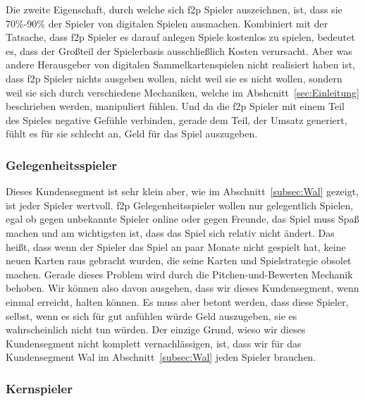 \documentclass[fontsize=12, a4aper]{scrartcl}
\begin{document}
\noindent Die zweite Eigenschaft, durch welche sich \ac{f2p} Spieler auszeichnen, ist, dass sie 70\%-90\% der Spieler von digitalen Spielen ausmachen. Kombiniert mit der Tatsache, dass \ac{f2p} Spieler es darauf anlegen Spiele kostenlos zu spielen, bedeutet es, dass der Großteil der Spielerbasis ausschließlich Kosten verursacht. Aber was andere Herausgeber von digitalen Sammelkartenspielen nicht realisiert haben ist, dass \ac{f2p} Spieler nichts ausgeben wollen, nicht weil sie es nicht wollen, sondern weil sie sich durch verschiedene Mechaniken, welche im Abshcnitt~\ref{sec:Einleitung} beschrieben werden, manipuliert fühlen. Und da die \ac{f2p} Spieler mit einem Teil des Spieles negative Gefühle verbinden, gerade dem Teil, der Umsatz generiert, fühlt es für sie schlecht an, Geld für das Spiel auszugeben. 

\subsubsection{Gelegenheitsspieler} \label{subsubsec:f2p_Spieler_Gelegenheitsspieler}

Dieses Kundensegment ist sehr klein aber, wie im Abschnitt~\ref{subsec:Wal} gezeigt, ist jeder Spieler wertvoll. \ac{f2p} Gelegenheitsspieler wollen nur gelegentlich Spielen, egal ob gegen unbekannte Spieler online oder gegen Freunde, das Spiel muss Spaß machen und am wichtigsten ist, dass das Spiel sich relativ nicht ändert. Das heißt, dass wenn der Spieler das Spiel an paar Monate nicht gespielt hat, keine neuen Karten raus gebracht wurden, die seine Karten und Spielstrategie obsolet machen. Gerade dieses Problem wird durch die Pitchen-und-Bewerten Mechanik behoben. Wir können also davon ausgehen, dass wir dieses Kundensegment, wenn einmal erreicht, halten können. Es muss aber betont werden, dass diese Spieler, selbst, wenn es sich für gut anfühlen würde Geld auszugeben, sie es wahrscheinlich nicht tun würden. Der einzige Grund, wieso wir dieses Kundensegment nicht komplett vernachlässigen, ist, dass wir für das Kundensegment \glqq Wal\grqq{} im Abschnitt~\ref{subsec:Wal} jeden Spieler brauchen.

\subsubsection{Kernspieler} \label{subsubsec:f2p_Spieler_Kernspieler}
\end{document}
